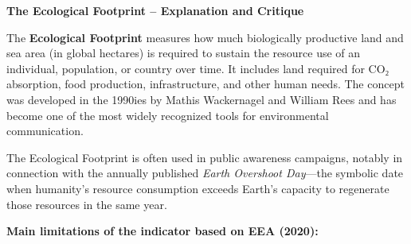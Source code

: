 \documentclass[
  a4paper,
  openany]{book}
\begin{document}
\begin{tcolorbox}[enhanced jigsaw, left=2mm, arc=.35mm, titlerule=0mm, opacityback=0, leftrule=.75mm, title={Tip}, breakable, bottomtitle=1mm, rightrule=.15mm, coltitle=black, toptitle=1mm, bottomrule=.15mm, colback=white, opacitybacktitle=0.6, colbacktitle=quarto-callout-tip-color!10!white, toprule=.15mm, colframe=quarto-callout-tip-color-frame]

\textbf{The Ecological Footprint -- Explanation and Critique}

The \textbf{Ecological Footprint} measures how much biologically
productive land and sea area (in global hectares) is required to sustain
the resource use of an individual, population, or country over time. It
includes land required for CO₂ absorption, food production,
infrastructure, and other human needs. The concept was developed in the
1990ies by Mathis Wackernagel and William Rees and has become one of the
most widely recognized tools for environmental communication.

The Ecological Footprint is often used in public awareness campaigns,
notably in connection with the annually published \emph{Earth Overshoot
Day}---the symbolic date when humanity's resource consumption exceeds
Earth's capacity to regenerate those resources in the same year.

\end{tcolorbox}

\textbf{Main limitations of the indicator based on EEA (2020):}
\end{document}
